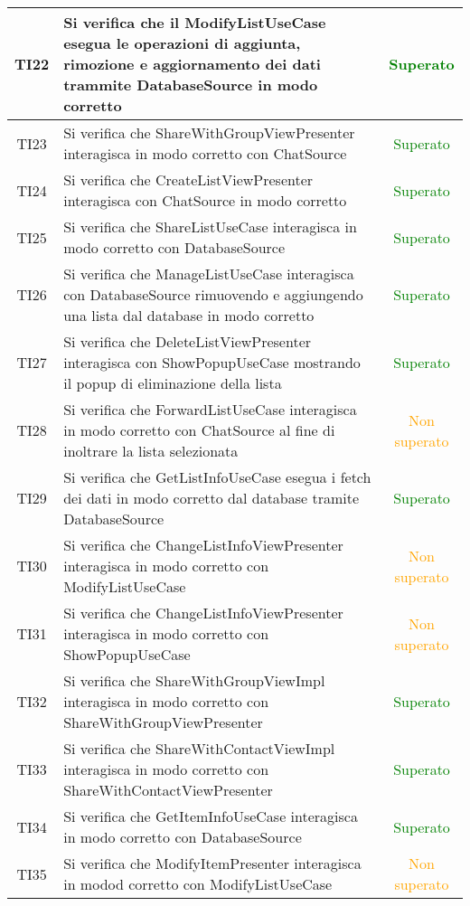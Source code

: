 \begin{center}
\begin{longtable}{|c|>{\centering}m{10cm}|c|}
		TI22 & Si verifica che il ModifyListUseCase esegua le operazioni di aggiunta, rimozione e aggiornamento dei dati trammite DatabaseSource in modo corretto & \textcolor{Green}{Superato}\\ \hline
		TI23 & Si verifica che ShareWithGroupViewPresenter interagisca in modo corretto con ChatSource & \textcolor{Green}{Superato}\\ \hline
		TI24 & Si verifica che CreateListViewPresenter interagisca con ChatSource in modo corretto & \textcolor{Green}{Superato}\\ \hline
		TI25 & Si verifica che ShareListUseCase interagisca in modo corretto con DatabaseSource & \textcolor{Green}{Superato}\\ \hline
		TI26 & Si verifica che ManageListUseCase interagisca con DatabaseSource rimuovendo e aggiungendo una lista dal database in modo corretto & \textcolor{Green}{Superato}\\ \hline
		TI27 & Si verifica che DeleteListViewPresenter interagisca con ShowPopupUseCase mostrando il popup di eliminazione della lista & \textcolor{Green}{Superato}\\ \hline
		TI28 & Si verifica che ForwardListUseCase interagisca in modo corretto con ChatSource al fine di inoltrare la lista selezionata & \textcolor{Orange}{Non superato}\\ \hline
		TI29 & Si verifica che GetListInfoUseCase esegua i fetch dei dati in modo corretto dal database tramite DatabaseSource & \textcolor{Green}{Superato}\\ \hline
		TI30 & Si verifica che ChangeListInfoViewPresenter interagisca in modo corretto con ModifyListUseCase & \textcolor{Orange}{Non superato}\\ \hline
		TI31 & Si verifica che ChangeListInfoViewPresenter interagisca in modo corretto con ShowPopupUseCase & \textcolor{Orange}{Non superato}\\ \hline
		TI32 & Si verifica che ShareWithGroupViewImpl interagisca in modo corretto con ShareWithGroupViewPresenter & \textcolor{Green}{Superato}\\ \hline
		TI33 & Si verifica che ShareWithContactViewImpl interagisca in modo corretto con ShareWithContactViewPresenter & \textcolor{Green}{Superato}\\ \hline
		TI34 & Si verifica che GetItemInfoUseCase interagisca in modo corretto con DatabaseSource & \textcolor{Green}{Superato}\\ \hline
		TI35 & Si verifica che ModifyItemPresenter interagisca in modod corretto con ModifyListUseCase & \textcolor{Orange}{Non superato}\\ \hline

\end{longtable}
\end{center}
